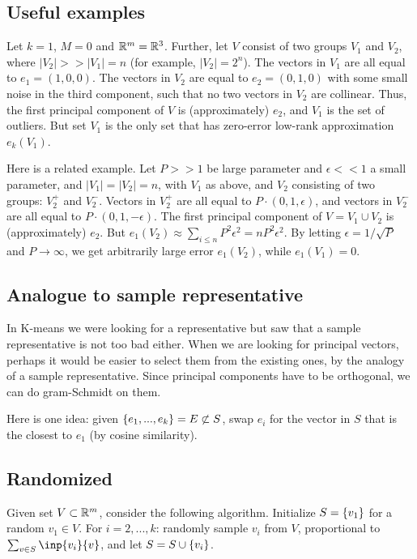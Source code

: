 \documentclass{article}
\begin{document}
\subsection{Useful examples}
Let $k = 1$, $M = 0$ and $\mathbb{R}^m = \mathbb{R}^3$. Further, let $V$ consist of two groups $V_1$ and $V_2$, where $|V_2| >> |V_1| = n$ (for example, $|V_2|=2^n$). The vectors in $V_1$ are all equal to $e_1 = (1,0,0)$. The vectors in $V_2$ are equal to $e_2=(0,1,0)$ with some small noise in the third component, such that no two vectors in $V_2$ are collinear. Thus, the first principal component of $V$ is (approximately) $e_2$, and $V_1$ is the set of outliers. But set $V_1$ is the only set that has zero-error low-rank approximation $e_k(V_1)$.

Here is a related example. Let $P >> 1$ be large parameter and $\epsilon << 1$ a small parameter, and $|V_1| = |V_2| = n$, with $V_1$ as above, and $V_2$ consisting of two groups: $V_2^+$ and $V_2^-$. Vectors in $V_2^+$ are all equal to $P\cdot(0,1,\epsilon)$, and vectors in $V_2^-$ are all equal to $P\cdot(0,1,-\epsilon)$. The first principal component of $V = V_1\cup V_2$ is (approximately) $e_2$. But $e_1(V_2) \approx \sum_{i\leq n}P^2\epsilon^2 = n P^2\epsilon^2$. By letting $\epsilon = 1/\sqrt{P}$ and $P\to \infty$, we get arbitrarily large error $e_1(V_2)$, while $e_1(V_1) = 0$.

\subsection{Analogue to sample representative}
In K-means we were looking for a representative but saw that a sample representative is not too bad either. When we are looking for principal vectors, perhaps it would be easier to select them from the existing ones, by the analogy of a sample representative. Since principal components have to be orthogonal, we can do gram-Schmidt on them. 

Here is one idea: given $\left\{e_1,...,e_k\right\} = E\not\subset S$, swap $e_i$ for the vector in $S$ that is the closest to $e_1$ (by cosine similarity).

\subsection{Randomized}
Given set $V \subset \mathbb{R}^m$, consider the following algorithm.
Initialize $S = \left\{v_1\right\}$ for a random $v_1\in V$. For $i=2,...,k$: randomly sample $v_i$ from $V$, proportional to $\sum_{v\in S}\inp{v_i}{v}$, and let $S = S\cup \left\{v_i\right\}$. 
\end{document}
